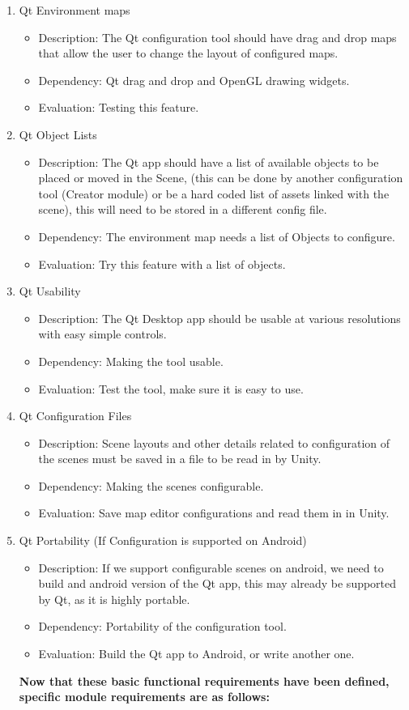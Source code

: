 \documentclass[a4paper,10pt]{article}
\begin{document}
\begin{enumerate}
\begin{itemize}
		\end{itemize}
		\item Qt Environment maps
		\begin{itemize}
		\item Description: The Qt configuration tool should have drag and drop maps that allow the user to change the layout of configured maps.
		\item Dependency:  Qt drag and drop and OpenGL drawing widgets. 
		\item Evaluation:  Testing this feature.
		\end{itemize}
		\item Qt Object Lists
		\begin{itemize}
		\item Description: The Qt app should have a list of available objects to be placed or moved in the Scene, (this can be done by another configuration tool 
		(Creator module) or be a hard coded list of assets linked with the scene), this will need to be stored in a different config file. 
		\item Dependency:  The environment map needs a list of Objects to configure. 
		\item Evaluation:  Try this feature with a list of objects.
		\end{itemize}

		\item Qt Usability
		\begin{itemize}
		\item Description: The Qt Desktop app should be usable at various resolutions with easy simple controls. 
		\item Dependency:  Making the tool usable.
		\item Evaluation:  Test the tool, make sure it is easy to use.
		\end{itemize}
		
		\item Qt Configuration Files
		\begin{itemize}
		\item Description: Scene layouts and other details related to configuration of the scenes must be saved in a file to be read in by Unity.
		\item Dependency:  Making the scenes configurable.
		\item Evaluation:  Save map editor configurations and read them in in Unity.
		\end{itemize}
		\item Qt Portability (If Configuration is supported on Android)
		\begin{itemize}
		\item Description: If we support configurable scenes on android, we need to build and android version of the Qt app, this may already be supported by Qt, as it is highly portable.
		\item Dependency:  Portability of the configuration tool.
		\item Evaluation:  Build the Qt app to Android, or write another one. 
		\end{itemize}
		\textbf{ Now that these basic functional requirements have been defined, specific module requirements are as follows:}
		

\end{enumerate}
\end{document}
